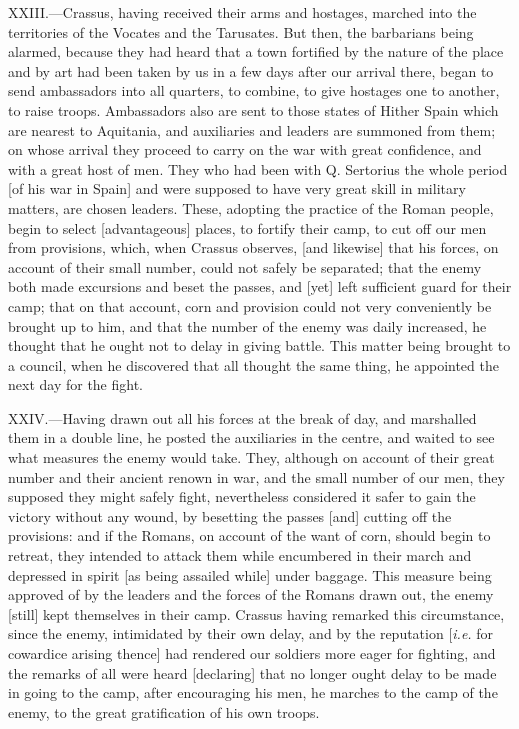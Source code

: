 XXIII.—Crassus, having received their arms and hostages, marched into
the territories of the Vocates and the Tarusates. But then, the
barbarians being alarmed, because they had heard that a town fortified
by the nature of the place and by art had been taken by us in a few days
after our arrival there, began to send ambassadors into all quarters, to
combine, to give hostages one to another, to raise troops. Ambassadors
also are sent to those states of Hither Spain which are nearest to
Aquitania, and auxiliaries and leaders are summoned from them; on whose
arrival they proceed to carry on the war with great confidence, and with
a great host of men. They who had been with Q. Sertorius the whole
period [of his war in Spain] and were supposed to have very great skill
in military matters, are chosen leaders. These, adopting the practice of
the Roman people, begin to select [advantageous] places, to fortify
their camp, to cut off our men from provisions, which, when Crassus
observes, [and likewise] that his forces, on account of their small
number, could not safely be separated; that the enemy both made
excursions and beset the passes, and [yet] left sufficient guard for
their camp; that on that account, corn and provision could not very
conveniently be brought up to him, and that the number of the enemy was
daily increased, he thought that he ought not to delay in giving battle.
This matter being brought to a council, when he discovered that all
thought the same thing, he appointed the next day for the fight.

XXIV.—Having drawn out all his forces at the break of day, and
marshalled them in a double line, he posted the auxiliaries in the
centre, and waited to see what measures the enemy would take. They,
although on account of their great number and their ancient renown in
war, and the small number of our men, they supposed they might safely
fight, nevertheless considered it safer to gain the victory without any
wound, by besetting the passes [and] cutting off the provisions: and if
the Romans, on account of the want of corn, should begin to retreat,
they intended to attack them while encumbered in their march and
depressed in spirit [as being assailed while] under baggage. This
measure being approved of by the leaders and the forces of the Romans
drawn out, the enemy [still] kept themselves in their camp. Crassus
having remarked this circumstance, since the enemy, intimidated by their
own delay, and by the reputation [\emph{i.e.} for cowardice arising thence]
had rendered our soldiers more eager for fighting, and the remarks of
all were heard [declaring] that no longer ought delay to be made in
going to the camp, after encouraging his men, he marches to the camp of
the enemy, to the great gratification of his own troops.

